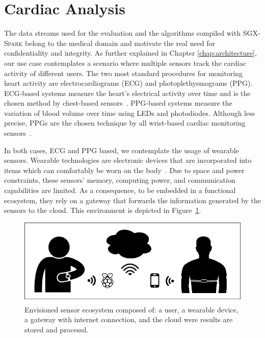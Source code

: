 \section{Cardiac Analysis} \label{sec:background:med}
The data streams used for the evaluation and the algorithms compiled with \textsc{SGX-Spark} belong to the medical domain and motivate the real need for confidentiality and integrity. 
As further explained in Chapter \ref{chap:architecture}, our use case contemplates a scenario where multiple sensors track the cardiac activity of different users.
The two most standard procedures for monitoring heart activity are electrocardiograms (ECG) and photoplethysmograms (PPG).
ECG-based systems measure the heart's electrical activity over time and is the chosen method by chest-based sensors~\cite{Tamura2018}.
PPG-based systems measure the variation of blood volume over time using LEDs and photodiodes.
Although less precise, PPGs are the chosen technique by all wrist-based cardiac monitoring sensors~\cite{Parak2015}.

In both cases, ECG and PPG based, we contemplate the usage of wearable sensors.
Wearable technologies are electronic devices that are incorporated into items which can comfortably be worn on the body~\cite{WearableDevices}.
Due to space and power constraints, these sensors' memory, computing power, and communication capabilities are limited.
As a consequence, to be embedded in a functional ecosystem, they rely on a gateway that forwards the information generated by the sensors to the cloud.
This environment is depicted in Figure~\ref{fig:wearable-ecosystem}.
\begin{figure}[h!]
    \centering
    \includegraphics[width=.8\textwidth]{./img/wearable-ecosystem.png}
    \caption[Envisioned user-sensor ecosystem.]{Envisioned sensor ecosystem composed of: a user, a wearable device, a gateway with internet connection, and the cloud were results are stored and processd.\label{fig:wearable-ecosystem}}
\end{figure}

